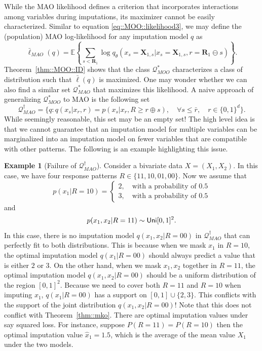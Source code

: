 \documentclass[aos, preprint]{imsart}
\theoremstyle{plain}
\theoremstyle{definition}
\newtheorem*{example}{Example}
\let\hat\widehat
\newcommand{\E}{\mbox{$\mathbb{E}$}}
\newcommand{\bX}{\mathbf{X}}
\newcommand{\bR}{\mathbf{R}}
\begin{document}
\begin{appendix}
While the MAO likelihood defines a criterion that incorporates interactions among variables 
during imputations, its maximizer cannot be easily characterized.
Similar to equation \eqref{eq::MOO::likelihood3}, we may define the (population) MAO log-likelihood for any imputation model $q$
as 
$$
\bar \ell_{MAO}(q)  = \E\left\{\sum_{s < \bR_1} \log q_\theta(x_s =\bX_{1,s}|x_{s} = \bX_{1, s}, r = \bR_1\ominus s)\right\}.
$$
Theorem~\ref{thm::MOO::ID}
shows that the class $\mathcal{Q}^*_{MOO}$
characterizes a class of distribution such that $\bar \ell(q)$
is maximized. 
One may wonder whether we can also find a similar set 
$\mathcal{Q}^*_{MAO}$
that maximizes this likelihood. 
A naive approach of generalizing $\mathcal{Q}^*_{MOO}$ to MAO is the following set
\begin{equation}
\mathcal{Q}^\dagger_{MAO} =\{q: q(x_s|x_r, r) = p(x_s|x_r, R\geq r\oplus s), \quad \forall s \leq  \bar r,\quad r \in\{0,1\}^d\}.
\label{eq::MAO::opt::set}
\end{equation}
While seemingly reasonable, this set may be an empty set!
The high level idea  is that
we cannot guarantee that an imputation  model for
multiple variables can be marginalized into an imputation model on 
fewer variables that are compatible with other patterns.
The following is an example highlighting this issue.

\begin{example}[Failure of $\mathcal{Q}^\dagger_{MAO} $]
Consider a bivariate data $X=(X_1,X_2)$.
In this case, we have four response patterns $R \in\{11,10,01,00\}$. 
Now we assume that 
$$
p(x_1|R=10)  = \begin{cases}
2,\quad\mbox{with a probability of } 0.5\\
3,\quad\mbox{with a probability of } 0.5
\end{cases}
$$
and 
$$
p(x_1,x_2|R=11)\sim {\sf Uni}[0,1]^2.
$$
In this case, there is no imputation model $q(x_1,x_2|R=00)$ in $\mathcal{Q}^\dagger_{MAO} $
that can perfectly fit to both distributions.
This is because when we mask $x_1$ in $R=10$, the optimal imputation model $q(x_1|R=00)$
should always predict a value that is either $2$ or $3$. 
On the other hand, when we mask $x_1,x_2$ together in $R=11$,
the optimal imputation model $q(x_1,x_2|R=00)$ should be a uniform distribution of the region $[0,1]^2$. 
Because we need to cover both $R=11$ and $R=10$ when imputing $x_1$,
$q(x_1|R=00)$ has a support on $[0,1]\cup\{2,3\}$. 
This conflicts with the support of the joint distribution $q(x_1,x_2|R=00)$!
Note that this does not conflict with Theorem~\ref{thm::mko}. There are optimal imputation values under say squared loss.
For instance, suppose $P(R=11) = P(R=10)$ then the optimal imputation value $\hat x_1 = 1.5$, which is the average of the mean value $X_1$
under the two models. 
\end{example}






\end{appendix}
\end{document}
